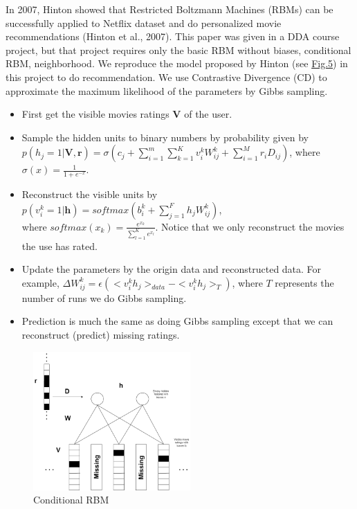 \begin{CJK*}{UTF8}{gbsn}
In 2007, Hinton showed that Restricted Boltzmann Machines (RBMs) can be successfully applied to Netflix dataset and do personalized movie recommendations (Hinton et al., 2007). This paper was given in a DDA course project, but that project requires only the basic RBM without biases, conditional RBM, neighborhood. We reproduce the model proposed by Hinton (see \hyperref[RBM]{Fig.5}) in this project to do recommendation. We use Contrastive Divergence (CD) to approximate the maximum likelihood of the parameters by Gibbs sampling.
\begin{itemize}
    \item First get the visible movies ratings $ \bm{V} $ of the user.
    \item Sample the hidden units to binary numbers by probability given by \\ $ p(h_j = 1 | \bm{V}, \bm{r}) = \sigma(c_j + \sum_{i = 1}^m \sum_{k = 1}^K v_i^k W_{ij}^k + \sum_{i = 1}^M r_i D_{ij}) $, where $ \sigma(x) = \frac{1}{1 + e^{-x}}  $.
    \item Reconstruct the visible units by $ p(v_i^k = 1 | \bm{h}) = softmax(b_i^k + \sum_{j = 1}^F h_j W_{ij}^k) $, \\where $ softmax(x_k) = \frac{e^{x_k}}{\sum_{l= 1}^K e^{x_l}} $. Notice that we only reconstruct the movies the use has rated.
    \item Update the parameters by the origin data and reconstructed data. For example, $ \Delta W_{ij}^k = \epsilon (<v_i^k h_j>_{data} - <v_i^k h_j>_T) $, where $ T $ represents the number of runs we do Gibbs sampling.
    \item Prediction is much the same as doing Gibbs sampling except that we can reconstruct (predict) missing ratings.
\end{itemize}
\begin{figure}[htbp]
\centering
\label{RBM}
\begin{minipage}[t]{0.45\textwidth}
\centering
\includegraphics[width=6cm]{conditionalRBM.png}
\caption{Conditional RBM}

\end{minipage}
\end{figure}
\end{CJK*}
